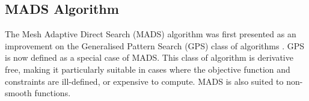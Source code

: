 

\subsection{MADS Algorithm}\label{sub_MADS}
The Mesh Adaptive Direct Search (MADS) algorithm \cite{Audet2007MeshOptimization} was first presented as an improvement on the Generalised Pattern Search (GPS) class of algorithms \cite{Torczon1997ON}. GPS is now defined as a special case of MADS. This class of algorithm is derivative free, making it particularly suitable in cases where the objective function and constraints are ill-defined, or expensive to compute. MADS is also suited to non-smooth functions.

